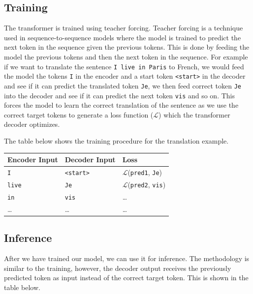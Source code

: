 \documentclass[main.tex]{subfiles}
\begin{document}
\subsection{Training}

The transformer is trained using teacher forcing. Teacher forcing is a technique used in sequence-to-sequence models where the model is trained to predict the next token in the sequence given the previous tokens. This is done by feeding the model the previous tokens and then the next token in the sequence. For example if we want to translate the sentence \texttt{I live in Paris} to French, we would feed the model the tokens \texttt{I} in the encoder and a start token \texttt{<start>} in the decoder and see if it can predict the translated token \texttt{Je}, we then feed correct token \texttt{Je} into the decoder and see if it can predict the next token \texttt{vis} and so on. This forces the model to learn the correct translation of the sentence as we use the correct target tokens to generate a loss function ($\mathcal{L}$) which the transformer decoder optimizes.

The table below shows the training procedure for the translation example. 

\begin{table}[H]
	\centering
	\begin{tabular}{lll}
	\toprule
	{Encoder Input} & {Decoder Input} & {Loss} \\
	\midrule
	\texttt{I}                     & \texttt{<start>} & $\mathcal{L}$(\texttt{pred1}, \texttt{Je}) \\
	\texttt{live}                  & \texttt{Je}                     & $\mathcal{L}$(\texttt{pred2}, \texttt{vis}) \\
	\texttt{in}                    & \texttt{vis}                    & \ldots \\
	\ldots                & \ldots                 & \ldots \\
	\bottomrule
	\end{tabular}
	\end{table}

\subsection{Inference}

After we have trained our model, we can use it for inference. The methodology is similar to the training, however, the decoder output receives the previously predicted token as input instead of the correct target token. This is shown in the table below.
\end{document}
